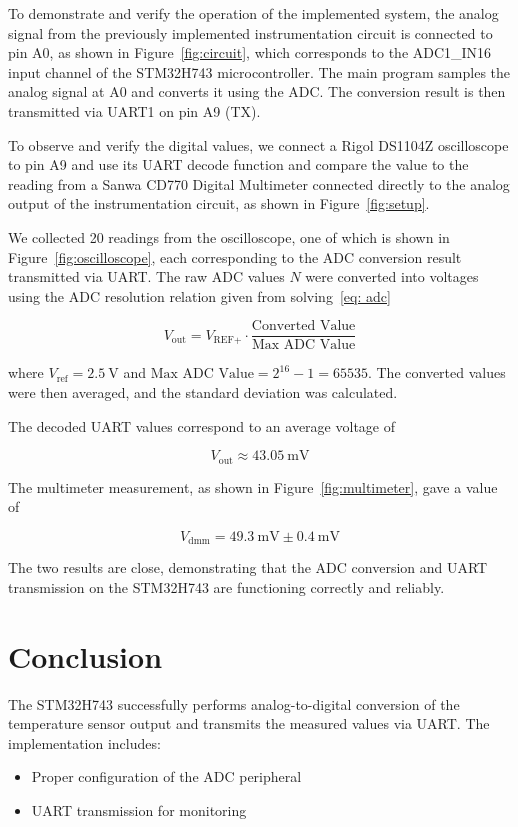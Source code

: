 \documentclass[12pt,a4paper]{article}
\begin{document}
To demonstrate and verify the operation of the implemented system, the analog signal from the previously implemented instrumentation circuit is connected to pin A0, as shown in Figure~\ref{fig:circuit}, which corresponds to the ADC1\_IN16 input channel of the STM32H743 microcontroller. The main program samples the analog signal at A0 and converts it using the ADC. The conversion result is then transmitted via UART1 on pin A9 (TX). 

To observe and verify the digital values, we connect a Rigol DS1104Z oscilloscope to pin A9 and use its UART decode function and compare the value to the reading from a Sanwa CD770 Digital Multimeter connected directly to the analog output of the instrumentation circuit, as shown in Figure~\ref{fig:setup}.

We collected 20 readings from the oscilloscope, one of which is shown in Figure~\ref{fig:oscilloscope}, each corresponding to the ADC conversion result transmitted via UART. The raw ADC values $N$ were converted into voltages using the ADC resolution relation given from solving~\eqref{eq: adc}

\begin{equation*}
    V_{\text{out}} = V_{\text{REF+}} \cdot \frac{\text{Converted Value}}{\text{Max ADC Value}}
\end{equation*}

where $V_{\text{ref}} = \SI{2.5}{\volt}$ and $\text{Max ADC Value} = 2^{16}-1 = 65535$. The converted values were then averaged, and the standard deviation was calculated.

The decoded UART values correspond to an average voltage of

\[
    V_{\text{out}} \approx \SI{43.05}{\milli\volt}
\]

The multimeter measurement, as shown in Figure~\ref{fig:multimeter}, gave a value of

\[
    V_{\text{dmm}} = \SI{49.3}{\milli\volt} \pm \SI{0.4}{\milli\volt}
\]  

The two results are close, demonstrating that the ADC conversion and UART transmission on the STM32H743 are functioning correctly and reliably.


\section{Conclusion}
The STM32H743 successfully performs analog-to-digital conversion of the temperature sensor output and transmits the measured values via UART. The implementation includes:
\begin{itemize}
    \item Proper configuration of the ADC peripheral
    \item UART transmission for monitoring
\end{itemize}

\newpage


\end{document}
